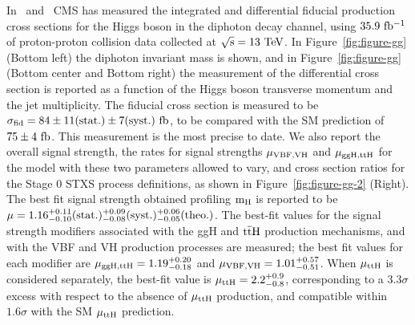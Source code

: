 \documentclass[10pt]{article}
\begin{document}
In~\cite{CMS:HIG-17-015} and~\cite{CMS:HIG-16-040} CMS has measured the integrated
and differential fiducial
production cross sections for the Higgs boson in the diphoton decay channel, using
${\rm 35.9~fb^{-1}}$ of proton-proton collision data collected at
${\rm \sqrt{s} = 13~TeV}$. In Figure~\ref{fig:figure-gg} (Bottom left) the diphoton
invariant mass is shown, and in Figure~\ref{fig:figure-gg} (Bottom center and Bottom
right) the measurement of the differential cross section is reported as a function
of the Higgs boson transverse momentum and the jet multiplicity. The fiducial cross
section is measured to be ${\rm \sigma_{fid} = 84\pm 11(stat.)\pm 7(syst.)~fb}$, to
be compared with the SM prediction of ${\rm 75 \pm 4~fb}$. This measurement is the
most precise to date. We also report the overall signal strength, the rates for
signal strengths ${\rm \mu_{VBF,VH}}$ and ${\rm \mu_{ggH,ttH}}$ for the model with
these two parameters allowed to vary, and cross section ratios for the Stage 0 STXS
process definitions, as shown in Figure~\ref{fig:figure-gg-2} (Right). The best fit
signal strength obtained profiling ${\rm m_H}$ is reported to be
${\rm \mu = 1.16_{-0.10}^{+0.11}(stat.)_{-0.08}^{+0.09}(syst.)_{-0.05}^{+0.06}(theo.)}$.
The best-fit values for the signal strength modifiers associated with the ggH and
${\rm t{\bar t}H}$ production mechanisms, and with the VBF and VH production processes
are measured; the best fit values for each modifier are
${\rm \mu_{ggH,ttH} = 1.19_{-0.18}^{+0.20}}$ and
${\rm \mu_{VBF,VH} = 1.01_{-0.51}^{+0.57}}$. When ${\rm \mu_{ttH}}$ is considered
separately, the best-fit value is ${\rm \mu_{ttH} = 2.2_{-0.8}^{+0.9}}$, corresponding
to a $3.3\sigma$ excess with respect to the absence of ${\rm \mu_{ttH}}$ production,
and compatible within $1.6\sigma$ with the SM ${\rm \mu_{ttH}}$ prediction.
\end{document}
